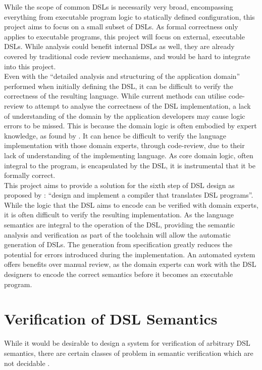 \documentclass[a4paper,11pt]{report}
\begin{document}
While the scope of common DSLs is necessarily very broad, encompassing everything from executable program logic to statically defined configuration, this project aims to focus on a small subset of DSLs.
As formal correctness only applies to executable programs, this project will focus on external, executable DSLs. 
While analysis could benefit internal DSLs as well, they are already covered by traditional code review mechanisms, and would be hard to integrate into this project.\\

Even with the ``detailed analysis and structuring of the application domain'' \citep{van2000domain} performed when initially defining the DSL, it can be difficult to verify the correctness of the resulting language. 
While current methods can utilise code-review to attempt to analyse the correctness of the DSL implementation, a lack of understanding of the domain by the application developers may cause logic errors to be missed. 
This is because the domain logic is often embodied by expert knowledge, as found by \cite{studer1998knowledge}. 
It can hence be difficult to verify the language implementation with those domain experts, through code-review, due to their lack of understanding of the implementing language.
As core domain logic, often integral to the program, is encapsulated by the DSL, it is instrumental that it be formally correct.\\

This project aims to provide a solution for the sixth step of DSL design as proposed by \cite{van2000domain}: ``design and implement a compiler that translates DSL programs''. 
While the logic that the DSL aims to encode can be verified with domain experts, it is often difficult to verify the resulting implementation.
As the language semantics are integral to the operation of the DSL, providing the semantic analysis and verification as part of the toolchain will allow the automatic generation of DSLs.
The generation from specification greatly reduces the potential for errors introduced during the implementation.
An automated system offers benefits over manual review, as the domain experts can work with the DSL designers to encode the correct semantics before it becomes an executable program.


\section{Verification of DSL Semantics} %
\label{sec:verification_of_dsl_semantics}
While it would be desirable to design a system for verification of arbitrary DSL semantics, there are certain classes of problem in semantic verification which are not decidable \citep{abdulla1994undecidable}. \\
\end{document}
